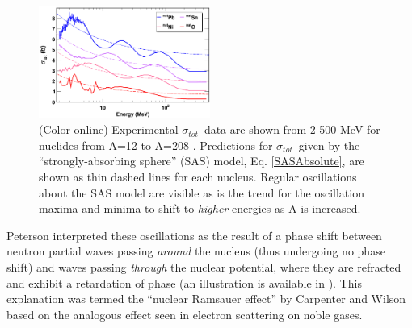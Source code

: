 \documentclass[twocolumn,secnumarabic,amssymb, nobibnotes, aps, prl,
superscriptaddress, nobalancelastpage]{revtex4}
\newcommand{\tot}{\ensuremath{\sigma_{tot}}}
\begin{document}
\begin{figure}
    \includegraphics[width=0.5\textwidth]{figures/ExampleTCS.png}
    \caption{
        (Color online) Experimental \tot\ data are shown from 2-500
        MeV for nuclides from A=12 to A=208
        \cite{Finlay1993, Schwartz1974, Poenitz1983, Abfalterer2000, Abfalterer2001}.
        Predictions for \tot\ given by the ``strongly-absorbing sphere'' (SAS)
        model, Eq. \ref{SASAbsolute}, are shown as thin dashed lines for each nucleus.
        Regular oscillations about the SAS model are visible
        as is the trend for the oscillation
        maxima and minima to shift to \textit{higher} energies as A is increased.
    }
    \label{SASphereVsExperiment}
\end{figure}
Peterson \cite{Peterson1962} interpreted these oscillations as the 
result of a phase shift between neutron partial waves passing \textit{around} the 
nucleus (thus undergoing no phase shift) and waves passing
\textit{through} the nuclear potential, where they are refracted and exhibit a 
retardation of phase (an illustration is available in \cite{Satchler1980}).
This explanation was termed the 
``nuclear Ramsauer effect'' by Carpenter and Wilson \cite{Carpenter1959} based on 
the analogous effect seen in electron scattering on noble gases.
\end{document}
